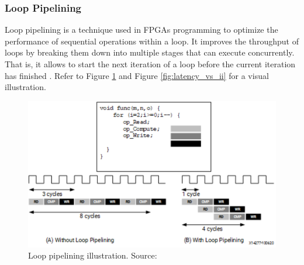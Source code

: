 \documentclass[a4paper, twoside]{report}
\theoremstyle{definition}
\numberwithin{equation}{section}
\begin{document}
\subsubsection{Loop Pipelining} \label{sec:loop_pipelining}

Loop pipelining is a technique used in FPGAs programming to optimize the performance of sequential operations within a loop.
It improves the throughput of loops by breaking them down into multiple stages
that can execute concurrently.
That is, it allows to start the next iteration of a loop before the current
iteration has finished \cite{AMD2023Pipelining}.
Refer to Figure \ref{fig:loop_pipelining} and Figure \ref{fig:latency_vs_ii} for a visual illustration.



\begin{figure}[h!]
    \centering
    \includegraphics[scale=0.7]{loop_pipelining.png}
    \caption{Loop pipelining illustration. Source: \cite{AMD2023Pipelining}}
    \label{fig:loop_pipelining}
\end{figure}
\end{document}
